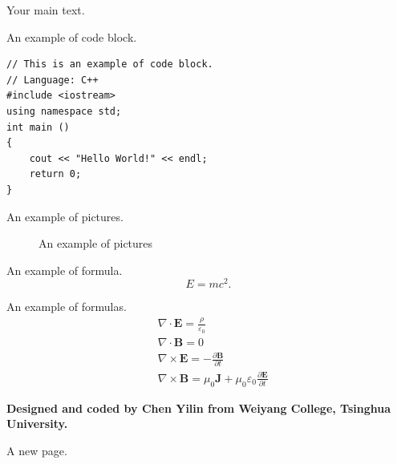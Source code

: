 \documentclass{article}
\begin{document}
	Your main text.

	An example of code block.
	\begin{lstlisting}
// This is an example of code block.
// Language: C++
#include <iostream>
using namespace std;
int main ()
{
	cout << "Hello World!" << endl;
	return 0;
}
	\end{lstlisting}

	An example of pictures.
	\begin{figure}[H]
		\centering
		\caption{An example of pictures}
	\end{figure}

	An example of formula.
	\begin{equation}
		E = mc^2.
	\end{equation}

	An example of formulas.
	\begin{align*}
		&\nabla \cdot \mathbf{E}=\frac{\rho}{\varepsilon_{0}} \\
		&\nabla \cdot \mathbf{B}=0 \\
		&\nabla \times \mathbf{E}=-\frac{\partial \mathbf{B}}{\partial t} \\
		&\nabla \times \mathbf{B}=\mu_{0} \mathbf{J}+\mu_{0} \varepsilon_{0} \frac{\partial \mathbf{E}}{\partial t}
	\end{align*}

	\quad \newline \quad

	\textbf{Designed and coded by Chen Yilin from Weiyang College, Tsinghua University.}

	\newpage
	A new page.
\end{document}
